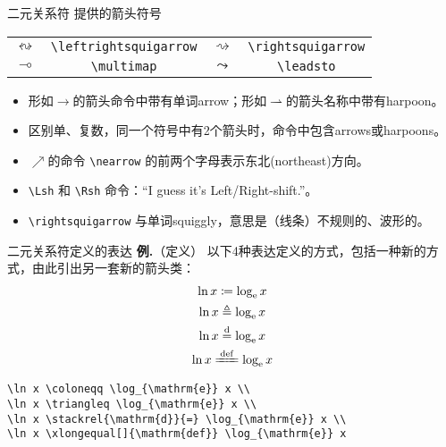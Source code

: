 \documentclass[mathserif]{beamer}
\newcommand{\codegreen}[1]{\textcolor{codegreen}{#1}}
\newenvironment{instance}{\zihao{-5}\textbf{\songti \codegreen{例.}}}{\hfill\par}
\begin{document}
\begin{frame}[fragile]{二元关系符}{\AmS{} 提供的箭头符号}
\begin{table}[H]
\centering
\begin{tabular}{cc|cc}
	\toprule
	$\leftrightsquigarrow$ & \lstinline'\leftrightsquigarrow' & $\rightsquigarrow$ & \lstinline'\rightsquigarrow' \\
	$\multimap$ & \lstinline'\multimap' & $\leadsto$ & \lstinline'\leadsto' \\
	\bottomrule
\end{tabular}
\end{table}
\begin{itemize}

\item 形如$\to$的箭头命令中带有单词arrow；形如$\rightharpoonup$的箭头名称中带有harpoon。

\item 区别单、复数，同一个符号中有2个箭头时，命令中包含arrows或harpoons。

\item $\nearrow$的命令 \lstinline'\nearrow' 的前两个字母表示东北(northeast)方向。

\item  \lstinline'\Lsh' 和 \lstinline'\Rsh' 命令：``I guess it's Left/Right-shift.''。

\item \lstinline'\rightsquigarrow' 与单词squiggly，意思是（线条）不规则的、波形的。
\end{itemize}
\end{frame}

\begin{frame}[fragile]{二元关系符}{定义的表达}
\begin{instance}（定义）
	以下4种表达定义的方式，包括一种新的方式，由此引出另一套新的箭头类：
\begin{equation*}
	\begin{gathered}
		\ln x \coloneqq \log_{\mathrm{e}} x \\
		\ln x \triangleq \log_{\mathrm{e}} x \\
		\ln x \stackrel{\mathrm{d}}{=} \log_{\mathrm{e}} x \\
		\ln x \xlongequal[]{\mathrm{def}} \log_{\mathrm{e}} x
	\end{gathered}
\end{equation*}
\begin{lstlisting}[numbers=none]
\ln x \coloneqq \log_{\mathrm{e}} x \\
\ln x \triangleq \log_{\mathrm{e}} x \\
\ln x \stackrel{\mathrm{d}}{=} \log_{\mathrm{e}} x \\
\ln x \xlongequal[]{\mathrm{def}} \log_{\mathrm{e}} x
\end{lstlisting}
\end{instance}
\end{frame}
\end{document}
